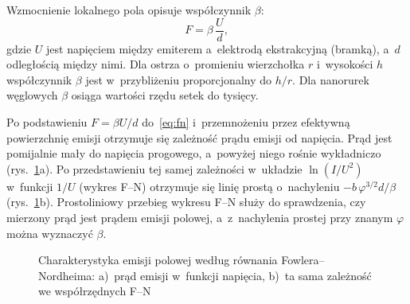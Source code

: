 Wzmocnienie lokalnego pola opisuje współczynnik $\beta$:
\begin{equation}
  F = \beta\,\frac{U}{d},
\end{equation}
gdzie $U$ jest napięciem między emiterem a~elektrodą ekstrakcyjną
(bramką), a~$d$ odległością między nimi. Dla ostrza o~promieniu
wierzchołka $r$ i~wysokości $h$ współczynnik $\beta$ jest w~przybliżeniu
proporcjonalny do $h/r$. Dla nanorurek węglowych $\beta$ osiąga wartości
rzędu setek do tysięcy.

Po podstawieniu $F=\beta U/d$ do~\eqref{eq:fn} i~przemnożeniu przez
efektywną powierzchnię emisji otrzymuje się zależność prądu emisji od
napięcia. Prąd jest pomijalnie mały do napięcia progowego, a~powyżej
niego rośnie wykładniczo (rys.~\ref{fig:fn}a). Po przedstawieniu tej
samej zależności w~układzie $\ln(I/U^2)$ w~funkcji $1/U$ (wykres F--N)
otrzymuje się linię prostą o~nachyleniu $-b\,\varphi^{3/2}d/\beta$
(rys.~\ref{fig:fn}b). Prostoliniowy przebieg wykresu F--N służy do
sprawdzenia, czy mierzony prąd jest prądem emisji polowej, a~z~nachylenia
prostej przy znanym $\varphi$ można wyznaczyć $\beta$.

\begin{figure}[htbp]
  \centering
  \caption{Charakterystyka emisji polowej według równania Fowlera--Nordheima:
    a)~prąd emisji w~funkcji napięcia, b)~ta sama zależność we współrzędnych
    F--N}
  \label{fig:fn}
\end{figure}

